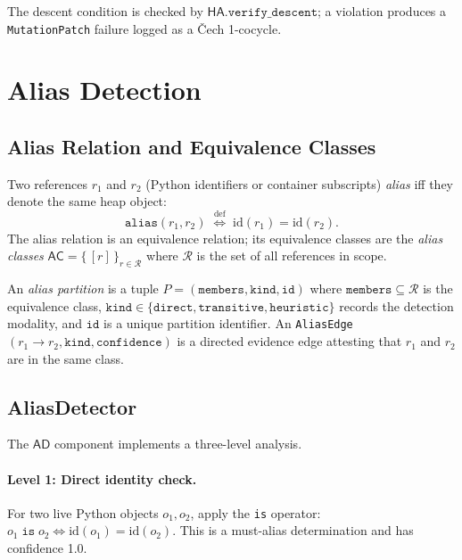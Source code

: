 \documentclass[11pt]{article}
\newcommand{\AliasCls}{\mathsf{AC}}         %
\newcommand{\AD}{\mathsf{AD}}               %
\newcommand{\HA}{\mathsf{HA}}               %
\newcommand{\defiff}{\stackrel{\mathrm{def}}{\iff}} %
\begin{document}
The descent condition is checked by $\HA.\mathtt{verify\_descent}$; a
violation produces a \texttt{MutationPatch} failure logged as a Čech
1-cocycle.

\section{Alias Detection}
\label{sec:alias-detection}

\subsection{Alias Relation and Equivalence Classes}

Two references $r_1$ and $r_2$ (Python identifiers or container
subscripts) \emph{alias} iff they denote the same heap object:
\[
  \mathtt{alias}(r_1, r_2) \;\defiff\; \mathrm{id}(r_1) = \mathrm{id}(r_2).
\]
The alias relation is an equivalence relation; its equivalence classes
are the \emph{alias classes} $\AliasCls = \{\,[r]\,\}_{r \in \mathcal{R}}$
where $\mathcal{R}$ is the set of all references in scope.

\begin{definition}
  \label{def:alias-partition}
  An \emph{alias partition} is a tuple
  $P = (\mathtt{members}, \mathtt{kind}, \mathtt{id})$
  where $\mathtt{members} \subseteq \mathcal{R}$ is the equivalence
  class, $\mathtt{kind} \in \{\mathtt{direct},\mathtt{transitive},
  \mathtt{heuristic}\}$ records the detection modality, and $\mathtt{id}$
  is a unique partition identifier.  An \texttt{AliasEdge}
  $(r_1 \to r_2, \mathtt{kind}, \mathtt{confidence})$ is a directed
  evidence edge attesting that $r_1$ and $r_2$ are in the same class.
\end{definition}

\subsection{AliasDetector}

The $\AD$ component implements a three-level analysis.

\paragraph{Level 1: Direct identity check.}
For two live Python objects $o_1, o_2$, apply the \texttt{is} operator:
$o_1\;\mathtt{is}\;o_2 \Leftrightarrow \mathrm{id}(o_1)=\mathrm{id}(o_2)$.
This is a must-alias determination and has confidence 1.0.
\end{document}
